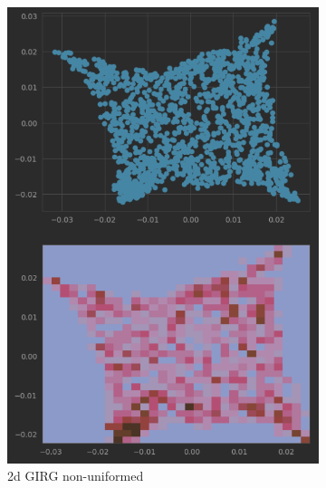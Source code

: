 \begin{figure}
    \centering

    \begin{subfigure}{0.45\textwidth}
      \centering
      \includegraphics[width=\linewidth]{figures/diffmap_plot_nonuniformed.png}
      \caption{2d GIRG non-uniformed}
      \label{fig:sub1}
    \end{subfigure}
    \hfill
    \begin{subfigure}{0.45\textwidth}
      \centering

\end{subfigure}
\end{figure}
